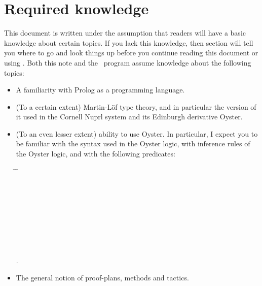 \section {Required knowledge}

This document is written under the assumption that readers will have a
basic knowledge about certain topics. If you lack this knowledge, then
section  will tell you where to go and look things
up before you continue reading this document or using \clam. Both this
note and the \clam\ program assume knowledge about the following
topics:
\begin{itemize}
\item
A  familiarity with Prolog as a programming language.
\item
(To a certain extent) Martin-L\"{o}f type theory, and in particular
the version of it used in the Cornell Nuprl system and its Edinburgh
derivative Oyster.
\item
(To an even lesser extent) ability to use Oyster. In particular, I expect you to be familiar with
the syntax used in the Oyster logic, with inference rules of the
Oyster logic, and with the following predicates:
\begin{tabbing}
	\= 	\=
	\kill {}	\>
	\> 	\\ 	\>
	\> 	\\
		\> 	\>
	\\ 		\> \p{up/0}		\>
	\\ 		\>
	\> 	\\  	\>
	\> 	\\
	\> 	\>
	\\ 		\>
	\> 	\\
		\> 		\>
		\\ 		\>
.	\> 		\\
\end{tabbing}
\item
The general notion of proof-plans, methods and tactics.
\end{itemize}

